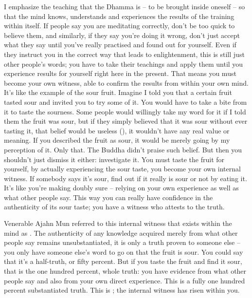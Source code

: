 I emphasize the teaching that the Dhamma is  -- to be brought inside oneself -- so that the mind knows, understands and experiences the results of the training within itself. If people say you are meditating correctly, don't be too quick to believe them, and similarly, if they say you're doing it wrong, don't just accept what they say until you've really practised and found out for yourself. Even if they instruct you in the correct way that leads to enlightenment, this is still just other people's words; you have to take their teachings and apply them until you experience results for yourself right here in the present. That means you must become your own witness, able to confirm the results from within your own mind. It's like the example of the sour fruit. Imagine I told you that a certain fruit tasted sour and invited you to try some of it. You would have to take a bite from it to taste the sourness. Some people would willingly take my word for it if I told them the fruit was sour, but if they simply believed that it was sour without ever tasting it, that belief would be useless (), it wouldn't have any real value or meaning. If you described the fruit as sour, it would be merely going by my perception of it. Only that. The Buddha didn't praise such belief. But then you shouldn't just dismiss it either: investigate it. You must taste the fruit for yourself, by actually experiencing the sour taste, you become your own internal witness. If somebody says it's sour, find out if it really is sour or not by eating it. It's like you're making doubly sure -- relying on your own experience as well as what other people say. This way you can really have confidence in the authenticity of its sour taste; you have a witness who attests to the truth.

Venerable Ajahn Mun referred to this internal witness that exists within the mind as . The authenticity of any knowledge acquired merely from what other people say remains unsubstantiated, it is only a truth proven to someone else -- you only have someone else's word to go on that the fruit is sour. You could say that it's a half-truth, or fifty percent. But if you taste the fruit and find it sour, that is the one hundred percent, whole truth: you have evidence from what other people say and also from your own direct experience. This is a fully one hundred percent substantiated truth. This is ; the internal witness has risen within you.


